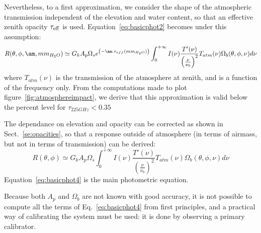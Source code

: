 
Nevertheless, to a first approximation, we consider the shape of the atmospheric
transmission independent of the elevation and water content, so that an
effective zenith opacity $\tau_{\rm{eff}}$ is used.
Equation~\ref{eq:basicphot2} becomes under this assumption: 
\begin{equation}
R(\theta, \phi, \am, mm_{H_{2}O}) \simeq G_{k}  A_{p}\Omega_{s} e^{\left(-\am
  . \tau_{eff}(mm_{H_{2}O})\right)} \int_{0}^{+\infty} I(\nu)
\frac{T'(\nu)}{\left(\frac{\nu}{\nu_{0}}\right)^{2}} T_{atm}(\nu)
\Omega_{b} (\theta, \phi, \nu) d\nu 
\label{eq:basicphot3}
\end{equation}
where $T_{atm}(\nu)$ is the transmission of the atmosphere at zenith,
and is a function of the frequency only. From the computations made to
plot figure~\ref{fig:atmosphereimpact}, we derive that this approximation 
is valid below the percent level for $\tau_{225GHz} < 0.35$

The dependance on elevation and opacity can be corrected as shown in
Sect.~\ref{se:opacities}, so that a response outside of atmosphere (in
terms of airmass, but not in terms of transmission) can be derived:
\begin{equation}
R(\theta, \phi) \simeq G_{k}  A_{p}\Omega_{s} \int_{0}^{+\infty} I(\nu)
\frac{T'(\nu)}{\left(\frac{\nu}{\nu_{0}}\right)^{2}} T_{atm}(\nu) \Omega_{b} (\theta, \phi, \nu)  d\nu 
\label{eq:basicphot4}
\end{equation}
Equation~\ref{eq:basicphot4} is the main photometric equation.

Because both $A_{p}$ and $ \Omega_{b} $ are not known with good
accuracy, it is not possible to compute all the terms of
Eq.~\ref{eq:basicphot4} from first principles, and a practical way of
calibrating the system must be used: it is done by observing a primary
calibrator.

